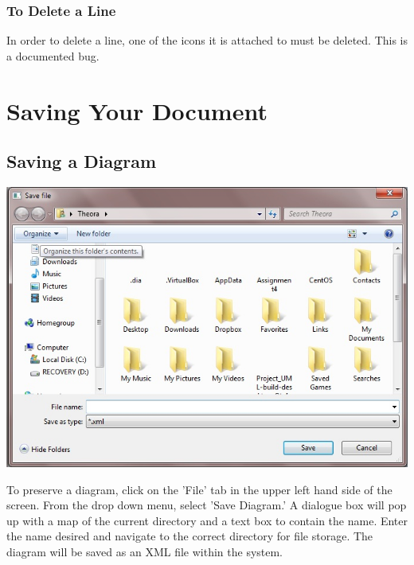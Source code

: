 \documentclass[]{article}
\begin{document}
\subsubsection{To Delete a Line}
{\color{black}
In order to delete a line, one of the icons it is attached to must be deleted. This is a documented bug. 
}
\section{Saving Your Document}
\subsection{Saving a Diagram}
{\color{black}
\includegraphics[scale = .50]{SaveAsFile}

To preserve a diagram, click on the 'File' tab in the upper left hand side of the screen. From the drop down menu, select 'Save Diagram.' A dialogue box will pop up with a map of the current directory and a text box to contain the name. Enter the name desired and navigate to the correct directory for file storage. The diagram will be saved as an XML file within the system. 
}
\end{document}
